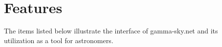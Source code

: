\renewcommand{\thefootnote}{\fnsymbol{footnote}}


\section{Features}

%
%
%
%
%
%
%
%
%
%
%
%
%
%
%
%
%
%
%
%
%


  The items listed below illustrate the interface of gamma-sky.net and its utilization as a tool for astronomers.

